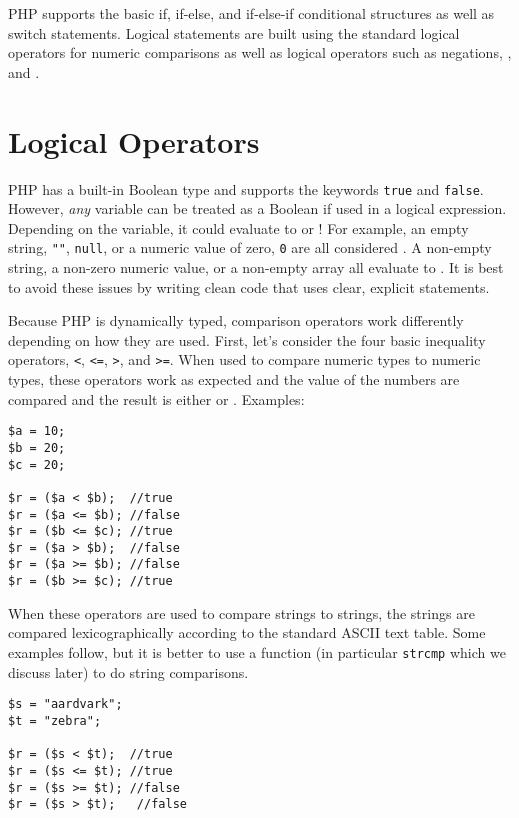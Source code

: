 

PHP supports the basic if, if-else, and if-else-if conditional structures as well as switch
statements.  Logical statements are built using the standard logical operators for
numeric comparisons as well as logical operators such as negations, \And, and 
\Or.

\section{Logical Operators}

PHP has a built-in Boolean type and supports the keywords \texttt{true}
and \texttt{false}.  However, \emph{any} variable can be treated as a 
Boolean if used in a logical expression.  Depending on the variable, it could
evaluate to \True or \False!  For example, an empty string, \texttt{""},
\texttt{null}, or a numeric value of zero, \texttt{0} are all
considered \False.  A non-empty string, a non-zero numeric value, or a
non-empty array all evaluate to \True.  It is best to avoid these issues by 
writing clean code that uses clear, explicit statements.

Because PHP is dynamically typed, comparison operators work differently 
depending on how they are used.  First, let's consider the four basic 
inequality operators, \texttt{<},  \texttt{<=},  \texttt{>},  
and \texttt{>=}.  When used to compare numeric types
to numeric types, these operators work as expected and the value of 
the numbers are compared and the result is either \True or \False.  Examples:

\begin{verbatim}
$a = 10;
$b = 20;
$c = 20;

$r = ($a < $b);  //true
$r = ($a <= $b); //false
$r = ($b <= $c); //true
$r = ($a > $b);  //false
$r = ($a >= $b); //false
$r = ($b >= $c); //true
\end{verbatim}

When these operators are used to compare strings to strings, the strings
are compared lexicographically according to the standard ASCII text table.
Some examples follow, but it is better to use a function (in particular 
\texttt{strcmp} which we discuss later) to do string comparisons.

\begin{verbatim}
$s = "aardvark";
$t = "zebra";

$r = ($s < $t);  //true
$r = ($s <= $t); //true
$r = ($s >= $t); //false
$r = ($s > $t);   //false
\end{verbatim}

